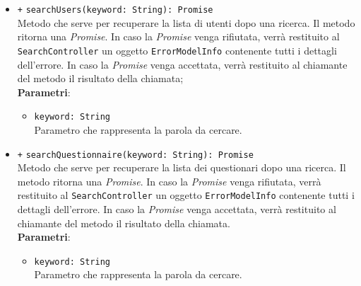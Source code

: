 \begin{itemize}
\begin{itemize}
		\item \texttt{+} \texttt{searchUsers(keyword: String): Promise} \\Metodo che serve per recuperare la lista di utenti dopo una ricerca. Il metodo ritorna una \textit{Promise}. In caso la \textit{Promise} venga rifiutata, verrà restituito al \texttt{SearchController} un oggetto \texttt{ErrorModelInfo} contenente tutti i dettagli dell'errore. In caso la \textit{Promise} venga accettata, verrà restituito al chiamante del metodo il risultato della chiamata;\\
		\textbf{Parametri}:
		\begin{itemize}
			\item \texttt{keyword: String} \\ Parametro che rappresenta la parola da cercare.
		\end{itemize}
		\item \texttt{+} \texttt{searchQuestionnaire(keyword: String): Promise} \\Metodo che serve per recuperare la lista dei questionari dopo una ricerca. Il metodo ritorna una \textit{Promise}. In caso la \textit{Promise} venga rifiutata, verrà restituito al \texttt{SearchController} un oggetto \texttt{ErrorModelInfo} contenente tutti i dettagli dell'errore. In caso la \textit{Promise} venga accettata, verrà restituito al chiamante del metodo il risultato della chiamata.\\
		\textbf{Parametri}:
		\begin{itemize}
			\item \texttt{keyword: String} \\ Parametro che rappresenta la parola da cercare.
		\end{itemize}
	\end{itemize}
\end{itemize}